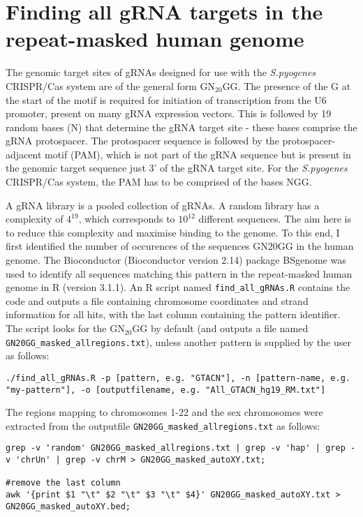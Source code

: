 \section{Finding all gRNA targets in the repeat-masked human genome}
\label{sec:GN20GG in genome}

The genomic target sites of gRNAs designed for use with the \textit{S.pyogenes} CRISPR/Cas system are of the general form GN$_{20}$GG. The presence of the G at the start of the motif is required for initiation of transcription from the U6 promoter, present on many gRNA expression vectors. This is followed by 19 random bases (N) that determine the gRNA target site - these bases comprise the gRNA protospacer. The protospacer sequence is followed by the protospacer-adjacent motif (PAM), which is not part of the gRNA sequence but is present in the genomic target sequence just 3' of the gRNA target site. For the \textit{S.pyogenes} CRISPR/Cas system, the PAM has to be comprised of the bases NGG. 

A gRNA library is a pooled collection of gRNAs. A random library has a complexity of $4^{19}$, which corresponds to $10^{12}$ different sequences. The aim here is to reduce this complexity and maximise binding to the genome. To this end, I first identified the number of occurences of the sequences GN20GG in the human genome. The Bioconductor (Bioconductor version 2.14) package BSgenome \citep{BSgenome} was used to identify all sequences matching this pattern in the repeat-masked human genome in R (version 3.1.1). An R script named \verb|find_all_gRNAs.R| contains the code and outputs a file containing chromosome coordinates and strand information for all hits, with the last column containing the pattern identifier. The script looks for the GN$_{20}$GG by default (and outputs a file named \verb|GN20GG_masked_allregions.txt|), unless another pattern is supplied by the user as follows:

\begin{small}\begin{lstlisting}
./find_all_gRNAs.R -p [pattern, e.g. "GTACN"], -n [pattern-name, e.g. "my-pattern"], -o [outputfilename, e.g. "All_GTACN_hg19_RM.txt"]
\end{lstlisting}\end{small}

The regions mapping to chromosomes 1-22 and the sex chromosomes were extracted from the outputfile \verb|GN20GG_masked_allregions.txt| as follows:

\begin{small}\begin{lstlisting}
grep -v 'random' GN20GG_masked_allregions.txt | grep -v 'hap' | grep -v 'chrUn' | grep -v chrM > GN20GG_masked_autoXY.txt;

#remove the last column
awk '{print $1 "\t" $2 "\t" $3 "\t" $4}' GN20GG_masked_autoXY.txt > GN20GG_masked_autoXY.bed;
\end{lstlisting}\end{small}

